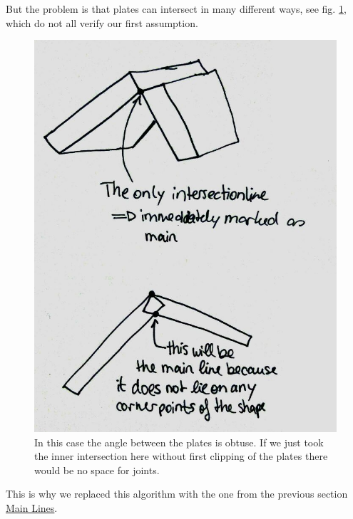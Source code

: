 \documentclass[../ClassicThesis.tex]{subfiles}
\begin{document}
But the problem is that plates can intersect in many different ways, see fig. \ref{fig:obtuseAssumption}, which do not all verify our first assumption. 
\begin{figure}[!ht]
\centering
\includegraphics[width=.5\columnwidth]{Images/06-1-graph-assumptionMainLine.jpg}
\caption{In this case the angle between the plates is obtuse. If we just took the inner intersection here without first clipping of the plates there would be no space for joints. }
\label{fig:obtuseAssumption}
\end{figure}
This is why we replaced this algorithm with the one from the previous section \hyperref[mainLine]{Main Lines}.
\end{document}
